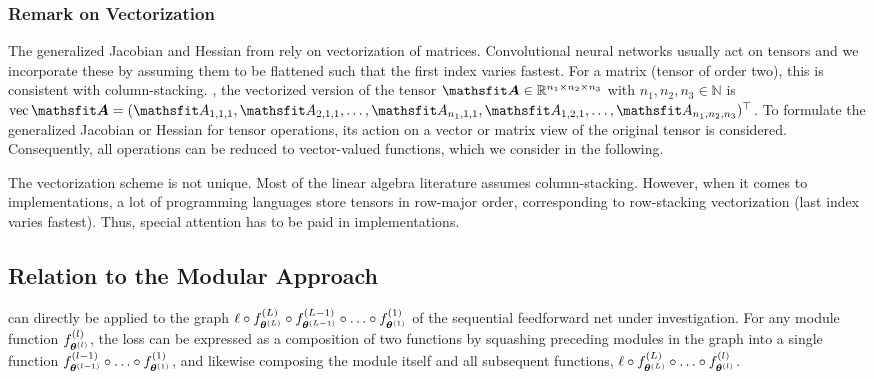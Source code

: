 \subsubsection{Remark on Vectorization}

The generalized Jacobian and Hessian from
\cite{magnus1999MatrixDifferentialCalculus} rely on vectorization of matrices.
Convolutional neural networks usually act on tensors and we incorporate these by
assuming them to be flattened such that the first index varies fastest. For a
matrix (tensor of order two), this is consistent with column-stacking. \Eg, the
vectorized version of the tensor $\tA \in \mathbb{R}^{n_1 \times n_2 \times
  n_3}$ with $n_1, n_2,n_3 \in \mathbb{N}$ is $\vec \tA = (\etA_{1,1,1},
\etA_{2,1,1},\dots, \etA_{n_1,1,1}, \etA_{1, 2, 1}, \dots, \etA_{n_1, n_2,
  n_3})^\top$. To formulate the generalized Jacobian or Hessian for tensor
operations, its action on a vector or matrix view of the original tensor is
considered. Consequently, all operations can be reduced to vector-valued
functions, which we consider in the following.

The vectorization scheme is not unique. Most of the linear algebra literature
assumes column-stacking. However, when it comes to implementations, a lot of
programming languages store tensors in row-major order, corresponding to
row-stacking vectorization (last index varies fastest). Thus, special attention
has to be paid in implementations.

\subsection{Relation to the Modular Approach}
\label{hbp::subsec:RelationMDCModularApproach}

 can directly be applied to the graph $\ell
\circ f^{(L)}_{{\bm{\theta}}^{(L)}} \circ f^{(L - 1)}_{{\bm{\theta}}^{(L-1)}} \circ \ldots
\circ f^{(1)}_{{\bm{\theta}}^{(1)}}$ of the sequential feedforward net under
investigation. For any module function $f^{(l)}_{{\bm{\theta}}^{(l)}}$, the loss can
be expressed as a composition of two functions by squashing preceding modules in
the graph into a single function $f^{(l - 1)}_{{\bm{\theta}}^{(l-1)}} \circ \ldots
\circ f^{(1)}_{{\bm{\theta}}^{(1)}}$, and likewise composing the module itself and all
subsequent functions, \ie $\ell \circ f^{(L)}_{{\bm{\theta}}^{(L)}} \circ \ldots \circ
f^{(l)}_{{\bm{\theta}}^{(l)}}$.

